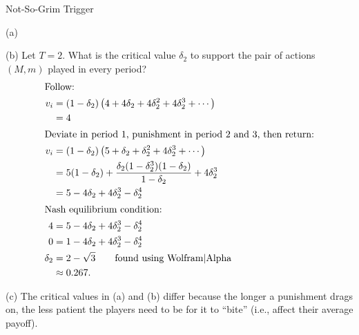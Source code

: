 \documentclass[8pt]{extarticle}
\begin{document}
\begin{problem}{Not-So-Grim Trigger}
\begin{problem}{(a)}
    \end{problem}
    \begin{problem}{(b)}
      Let $T = 2$. What is the critical value $\delta_2$ to support the pair of actions $(M,m)$ played in every period?
      \tcblower
      \begin{align*}
        \shortintertext{Follow:}
        v_i &= (1-\delta_2)\left(4 + 4\delta_2 + 4\delta_2^2 + 4\delta_2^3 + \cdots\right)\\
            &= 4\\
        \shortintertext{Deviate in period $1$, punishment in period $2$ and $3$, then return:}
        v_i &= (1-\delta_2)\left(5 + \delta_2 + \delta_2^2 + 4\delta_2^3 + \cdots\right) \\
            &= 5(1-\delta_2) + \frac{\delta_2(1-\delta_2^3)(1-\delta_2)}{1-\delta_2} + 4\delta_2^3\\
            &= 5-4\delta_2 + 4\delta_2^3 - \delta_2^4\\
        \shortintertext{Nash equilibrium condition:}
        4 &= 5-4\delta_2 + 4\delta_2^3 - \delta_2^4\\
        0 &= 1 - 4\delta_2 + 4\delta_2^3 - \delta_2^4\\
        \delta_2 &= 2-\sqrt{3}\tag*{found using Wolfram|Alpha}\\
                 &\approx 0.267.
      \end{align*}
    \end{problem}
    \begin{problem}{(c)}
      The critical values in (a) and (b) differ because the longer a punishment drags on, the less patient the players need to be for it to ``bite'' (i.e., affect their average payoff).
    \end{problem}
  \end{problem}
\end{document}
